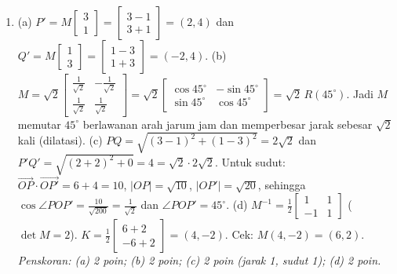 \documentclass[a4paper,11pt]{article}
\begin{document}
\begin{enumerate}[leftmargin=2em,itemsep=3pt,topsep=2pt]
\item[\textbf{2.}] (a) $P'=M\begin{bmatrix}3\\1\end{bmatrix}=\begin{bmatrix}3-1\\3+1\end{bmatrix}=(2,4)$ dan $Q'=M\begin{bmatrix}1\\3\end{bmatrix}=\begin{bmatrix}1-3\\1+3\end{bmatrix}=(-2,4)$. (b) $M=\sqrt2\begin{bmatrix}\frac{1}{\sqrt2}&-\frac{1}{\sqrt2}\\\frac{1}{\sqrt2}&\frac{1}{\sqrt2}\end{bmatrix}=\sqrt2\begin{bmatrix}\cos45^\circ&-\sin45^\circ\\\sin45^\circ&\cos45^\circ\end{bmatrix}=\sqrt2\,R(45^\circ)$. Jadi $M$ memutar $45^\circ$ berlawanan arah jarum jam dan memperbesar jarak sebesar $\sqrt2$ kali (dilatasi). (c) $PQ=\sqrt{(3-1)^2+(1-3)^2}=2\sqrt2$ dan $P'Q'=\sqrt{(2+2)^2+0}=4=\sqrt2\cdot2\sqrt2$. Untuk sudut: $\overrightarrow{OP}\cdot\overrightarrow{OP'}=6+4=10$, $|OP|=\sqrt{10}$, $|OP'|=\sqrt{20}$, sehingga $\cos\angle POP'=\frac{10}{\sqrt{200}}=\frac{1}{\sqrt2}$ dan $\angle POP'=45^\circ$. (d) $M^{-1}=\frac12\begin{bmatrix}1&1\\-1&1\end{bmatrix}$ ($\det M=2$). $K=\frac12\begin{bmatrix}6+2\\-6+2\end{bmatrix}=(4,-2)$. Cek: $M(4,-2)=(6,2)$. \\ \textit{Penskoran: (a) 2 poin; (b) 2 poin; (c) 2 poin (jarak 1, sudut 1); (d) 2 poin.}

\end{enumerate}
\end{document}
